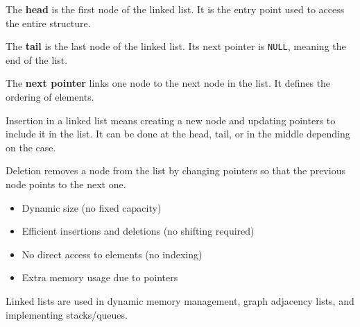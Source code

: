 \documentclass[11pt,a4paper,openany]{book}
\begin{document}
\begin{defnbox}[title=Head]
The \textbf{head} is the first node of the linked list.  
It is the entry point used to access the entire structure.
\end{defnbox}

\begin{defnbox}[title=Tail]
The \textbf{tail} is the last node of the linked list.  
Its next pointer is \texttt{NULL}, meaning the end of the list.
\end{defnbox}

\begin{defnbox}[title=Next pointer]
The \textbf{next pointer} links one node to the next node in the list.  
It defines the ordering of elements.
\end{defnbox}

\begin{defnbox}[title=Insertion]
Insertion in a linked list means creating a new node and updating pointers to include it in the list.  
It can be done at the head, tail, or in the middle depending on the case.
\end{defnbox}

\begin{defnbox}[title=Deletion]
Deletion removes a node from the list by changing pointers so that the previous node points to the next one.
\end{defnbox}

\begin{defnbox}[title=Advantages]
\begin{itemize}
    \item Dynamic size (no fixed capacity)
    \item Efficient insertions and deletions (no shifting required)
\end{itemize}
\end{defnbox}

\begin{defnbox}[title=Disadvantages]
\begin{itemize}
    \item No direct access to elements (no indexing)
    \item Extra memory usage due to pointers
\end{itemize}
\end{defnbox}

\begin{defnbox}[title=Applications]
Linked lists are used in dynamic memory management, graph adjacency lists, and implementing stacks/queues.
\end{defnbox}
\end{document}

